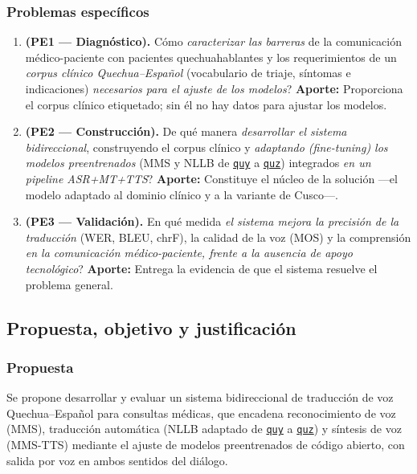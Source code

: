 \documentclass[12pt,a4paper]{article}
\newcommand{\obsdos}[1]{\textcolor{verdeOK}{#1}}
\DeclareRobustCommand{\sig}[1]{\hyperlink{sig:#1}{\texttt{#1}}}
\begin{document}
\subsubsection{Problemas espec{\'i}ficos}
\begin{enumerate}
  \item \obsdos{\textbf{(PE1 --- Diagn{\'o}stico).} {\textquestiondown}C{\'o}mo \emph{caracterizar las barreras} de la comunicaci{\'o}n m{\'e}dico-paciente con pacientes quechuahablantes y los requerimientos de un \emph{corpus cl{\'i}nico Quechua--Espa{\~n}ol} (vocabulario de triaje, s{\'i}ntomas e indicaciones) \emph{necesarios para el ajuste de los modelos}? \textbf{Aporte:} Proporciona el corpus cl{\'i}nico etiquetado; sin {\'e}l no hay datos para ajustar los modelos.}
  \item \obsdos{\textbf{(PE2 --- Construcci{\'o}n).} {\textquestiondown}De qu{\'e} manera \emph{desarrollar el sistema bidireccional}, construyendo el corpus cl{\'i}nico y \emph{adaptando (fine-tuning) los modelos preentrenados} (MMS y NLLB de \sig{quy} a \sig{quz}) integrados \emph{en un pipeline ASR+MT+TTS}? \textbf{Aporte:} Constituye el n{\'u}cleo de la soluci{\'o}n ---el modelo adaptado al dominio cl{\'i}nico y a la variante de Cusco---.}
  \item \obsdos{\textbf{(PE3 --- Validaci{\'o}n).} {\textquestiondown}En qu{\'e} medida \emph{el sistema mejora la precisi{\'o}n de la traducci{\'o}n} (WER, BLEU, chrF), la calidad de la voz (MOS) y la comprensi{\'o}n \emph{en la comunicaci{\'o}n m{\'e}dico-paciente, frente a la ausencia de apoyo tecnol{\'o}gico}? \textbf{Aporte:} Entrega la evidencia de que el sistema resuelve el problema general.}
\end{enumerate}

\subsection{Propuesta, objetivo y justificaci{\'o}n}

\subsubsection{Propuesta}
Se propone desarrollar y evaluar un sistema bidireccional de traducci{\'o}n de voz
Quechua--Espa{\~n}ol para consultas m{\'e}dicas, que encadena reconocimiento de voz (MMS),
traducci{\'o}n autom{\'a}tica (NLLB adaptado de \sig{quy} a \sig{quz}) y s{\'i}ntesis de voz
(MMS-TTS) mediante el ajuste de modelos preentrenados de c{\'o}digo abierto, con salida por voz en
ambos sentidos del di{\'a}logo.
\end{document}
